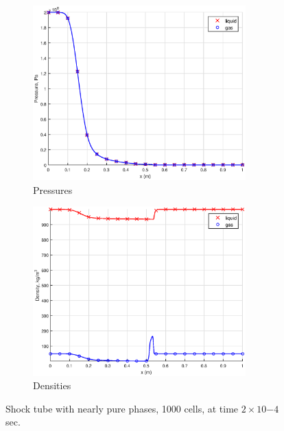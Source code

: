 \begin{figure}[H]
\begin{subfigure}[b]{0.495\textwidth}
                \label{fig:nearly_pure_velocity}
        \end{subfigure}
        \begin{subfigure}[b]{0.495\textwidth}
                \centering
                \includegraphics[width=0.9\textwidth]{figures/Nearly_pure_pressure_1000cells.eps}
                \caption{Pressures}
                \label{fig:nearly_pure_press}
        \end{subfigure}        
        \begin{subfigure}[b]{0.495\textwidth}
                \centering
                \includegraphics[width=0.9\textwidth]{figures/Nearly_pure_density_1000cells.eps}
                \caption{Densities}
                \label{fig:nearly_pure_density}
        \end{subfigure}
        \caption{Shock tube with nearly pure phases, 1000 cells, at time $2 \times 10{-4}$ sec.}\label{fig:nearly_pure}
\end{figure}


